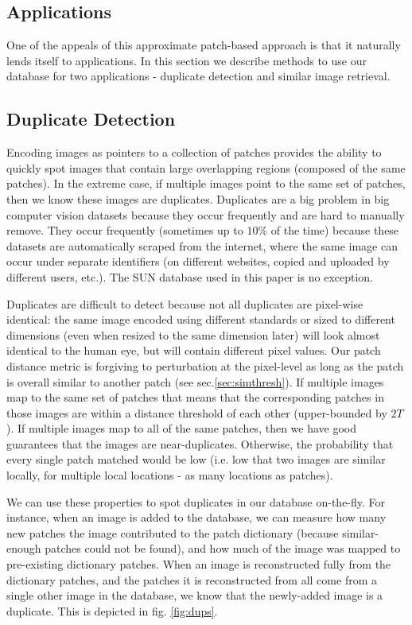 \subsection{Applications}\label{sec:apps}

One of the appeals of this approximate patch-based approach
is that it naturally lends itself to applications. In this
section we describe methods to use our database for
two applications - duplicate detection and similar image retrieval.

\subsection{Duplicate Detection}\label{sec:dups}

Encoding images as pointers to a collection of patches provides the ability to quickly spot images that contain large overlapping regions (composed of the same patches). In the extreme case, if multiple images point to the same set of patches, then we know these images are duplicates. Duplicates are a big problem in big computer vision datasets because they occur frequently and are hard to manually remove. They occur frequently (sometimes up to $10\%$ of the time) because these datasets are automatically scraped from the internet, where the same image can occur under separate identifiers (on different websites, copied and uploaded by different users, etc.). The SUN database \cite{SUN} used in this paper is no exception.

Duplicates are difficult to detect because not all duplicates are pixel-wise identical: the same image encoded using different standards or sized to different dimensions (even when resized to the same dimension later) will look almost identical to the human eye, but will contain different pixel values. Our patch distance metric is forgiving to perturbation at the pixel-level as long as the patch is overall similar to another patch (see sec.\ref{sec:simthresh}). If multiple images map to the same set of patches that means that the corresponding patches in those images are within a distance threshold of each other (upper-bounded by $2T$). If multiple images map to all of the same patches, then we have good guarantees that the images are near-duplicates. Otherwise, the probability that every single patch matched would be low (i.e. low that two images are similar locally, for multiple local locations - as many locations as patches).

We can use these properties to spot duplicates in our database on-the-fly. For instance, when an image is added to the database, we can measure how many new patches the image contributed to the patch dictionary (because similar-enough patches could not be found), and how much of the image was mapped to pre-existing dictionary patches. When an image is reconstructed fully from the dictionary patches, and the patches it is reconstructed from all come from a single other image in the database, we know that the newly-added image is a duplicate. This is depicted in fig. \ref{fig:dups}.

